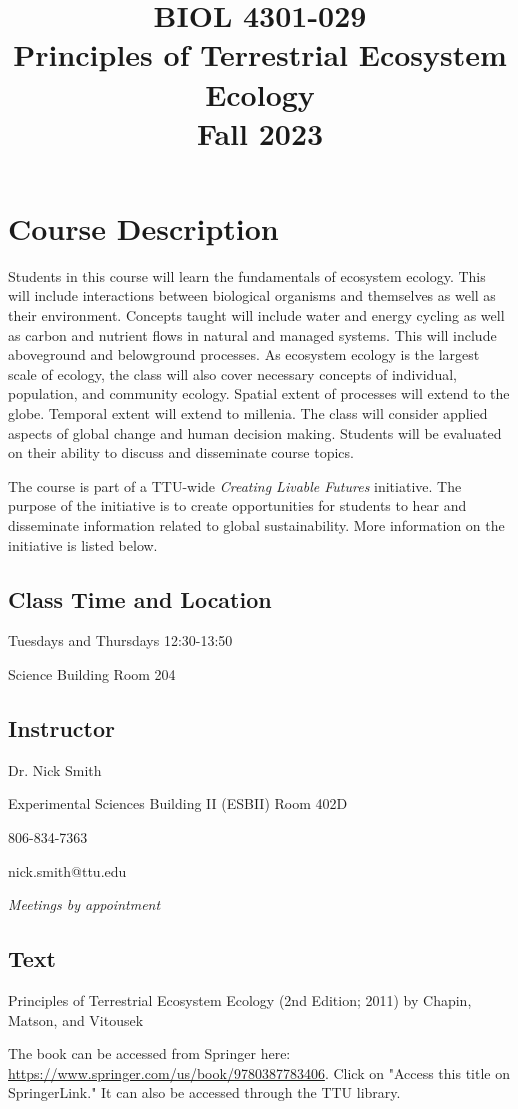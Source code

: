 \documentclass[12pt, notitlepage]{article}   	%
\title{
	\textbf{
		BIOL 4301-029
	} \\
	\large Principles of Terrestrial Ecosystem Ecology \\
	\large Fall 2023
}
\date{\vspace{-5ex}}
\begin{document}
{\selectfont %

\maketitle

\section{Course Description}
Students in this course will learn the fundamentals of ecosystem ecology.
This will include interactions between biological organisms and themselves as well as
their environment. Concepts taught will include water and energy cycling as well as carbon
and nutrient flows in natural and managed systems.
This will include aboveground and belowground processes.
As ecosystem ecology is the largest scale of ecology, the class will also cover necessary
concepts of individual, population, and community ecology.
Spatial extent of processes will extend to the globe. Temporal extent will extend to 
millenia. The class will consider applied aspects of global change and human decision making.
Students will be evaluated on their 
ability to discuss and disseminate course topics.

The course is part of a TTU-wide \textit{Creating Livable Futures} initiative.
The purpose of the initiative is to create opportunities for students to hear and
disseminate information related to global sustainability. More information on the
initiative is listed below.

\subsection{Class Time and Location}
Tuesdays and Thursdays 12:30-13:50

Science Building Room 204

\newpage

\subsection{Instructor}
Dr. Nick Smith \par
Experimental Sciences Building II (ESBII) Room 402D \par
806-834-7363 \par
nick.smith@ttu.edu \par
\textit{Meetings by appointment}

\subsection{Text}
Principles of Terrestrial Ecosystem Ecology (2nd Edition; 2011) 
by Chapin, Matson, and Vitousek \par
The book can be accessed from Springer here: 
\url{https://www.springer.com/us/book/9780387783406}. Click on "Access this title on 
SpringerLink." It can also be accessed through the TTU library.

}
\end{document}
